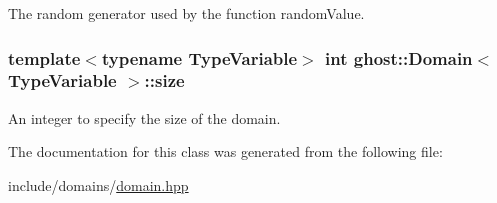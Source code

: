 The random generator used by the function random\-Value. 

\hypertarget{classghost_1_1Domain_a13e282f60c6c7cddf5b5716b45ad161c}{
\subsubsection[{size}]{\setlength{\rightskip}{0pt plus 5cm}template$<$typename Type\-Variable$>$ int {\bf ghost\-::\-Domain}$<$ Type\-Variable $>$\-::size\hspace{0.3cm}{\ttfamily [protected]}}}\label{classghost_1_1Domain_a13e282f60c6c7cddf5b5716b45ad161c}


An integer to specify the size of the domain. 



The documentation for this class was generated from the following file\-:\begin{DoxyCompactItemize}
\item 
include/domains/\hyperlink{domain_8hpp}{domain.\-hpp}\end{DoxyCompactItemize}
